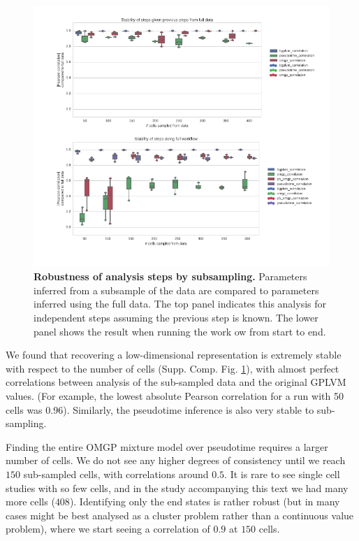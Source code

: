 \begin{figure}
    \centering
    \includegraphics[width=\textwidth]{"fig-robustness"}
    \caption[Robustness of analysis steps by subsampling]{\textbf{Robustness of analysis steps by subsampling.} Parameters inferred from a subsample of the data are compared to parameters inferred using the full data. The top panel indicates this analysis for independent steps assuming the previous step is known. The lower panel shows the result when running the work ow from start to end.}
    \label{fig:robustness}
\end{figure}

We found that recovering a low-dimensional representation is extremely stable with respect to the number of cells (Supp. Comp. Fig. \ref{fig:robustness}), with almost perfect correlations between analysis of the sub-sampled data and the original GPLVM values. (For example, the lowest absolute Pearson correlation for a run with 50 cells was 0.96). Similarly, the pseudotime inference is also very stable to sub-sampling.

Finding the entire OMGP mixture model over pseudotime requires a larger number of cells. We do not see any higher degrees of consistency until we reach $ 150 $ sub-sampled cells, with correlations around $ 0.5 $. It is rare to see single cell studies with so few cells, and in the study accompanying this text we had many more cells ($ 408 $). Identifying only the end states is rather robust (but in many cases might be best analysed as a cluster problem rather than a continuous value problem), where we start seeing a correlation of $ 0.9 $ at $ 150 $ cells.

